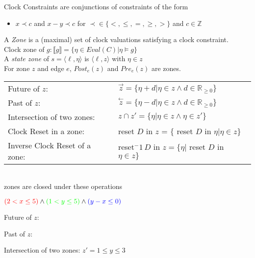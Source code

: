 \documentclass[a4paper, 10pt]{article}
\begin{document}
\begin{mdframed}
\begin{itemize}
\end{itemize}
Clock Constraints are conjunctions of constraints of the form
\begin{itemize}
    \item $x\prec c$ and $x-y\prec c$ for $\prec\in\{<,\leq,=,\geq,>\}$ and $c\in\mathds{Z}$
\end{itemize}
A \emph{Zone} is a (maximal) set of clock valuations satisfying a clock constraint. \\
Clock zone of $g:\llbracket g\rrbracket=\{\eta\in Eval(C)|\eta\models g\}$ \\
A \emph{state zone} of $s=\langle\ell,\eta\rangle$ is $\langle\ell,z\rangle$ with $\eta\in z$ \\
For zone $z$ and edge $e$, $Post_e(z)$ and $Pre_e(z)$ are zones. \\
\begin{tabular}{ll}
Future of $z$: & $\overset{\rightarrow}{z} = \{\eta+d | \eta\in z\wedge d\in\mathds{R}_{\geq0}\}$ \\
Past of $z$: & $\overset{\leftarrow}{z} = \{\eta-d | \eta\in z\wedge d\in\mathds{R}_{\geq0}\}$ \\
Intersection of two zones: & $z\cap z' = \{\eta|\eta\in z \wedge\eta\in z'\}$ \\
Clock Reset in a zone: & reset $D$ in $z$ = $\{$ reset $D$ in $\eta | \eta\in z\}$ \\
Inverse Clock Reset of a zone: & reset$^-1\,D$ in $z=\{\eta|$ reset $D$ in $\eta\in z\}$
\end{tabular}
\\
zones are closed under these operations
\begin{multicols}{2}
$\textcolor{red}{(2<x\leq5)}\wedge\textcolor{green}{(1<y\leq5)}\wedge\textcolor{blue}{(y-x\leq0)}$
\begin{center}
\scalebox{.7}{}
\end{center}
Future of $z$:
\begin{center}
\scalebox{.7}{}
\end{center}
Past of $z$:
\begin{center}
\scalebox{.7}{}
\end{center}
\columnbreak
Intersection of two zones: {\tiny $z'=1\leq y\leq3$}
\begin{center}
\scalebox{.7}{}
\end{center}

\end{multicols}
\end{mdframed}
\end{document}
